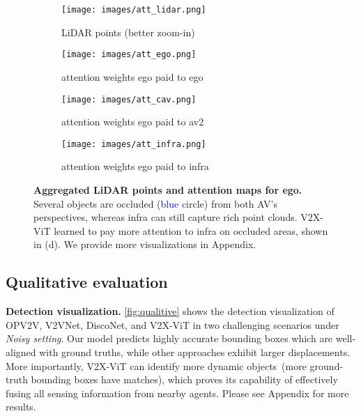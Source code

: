 \documentclass[runningheads]{llncs}
\begin{document}
\begin{figure}[!tb]
     \centering
     \begin{subfigure}[b]{0.24\textwidth}
         \centering
         \texttt{[image: images/att\_lidar.png]}
         \caption{LiDAR points (better zoom-in)}
         \label{fig:att_lidar}
     \end{subfigure}
     \begin{subfigure}[b]{0.24\textwidth}
         \centering
         \texttt{[image: images/att\_ego.png]}
         \caption{attention weights ego paid to ego}
         \label{fig:att_ego}
     \end{subfigure}
     \begin{subfigure}[b]{0.24\textwidth}
         \centering
         \texttt{[image: images/att\_cav.png]}
         \caption{attention weights ego paid to av2}
         \label{fig:att_cav}
     \end{subfigure}
     \begin{subfigure}[b]{0.24\textwidth}
         \centering
         \texttt{[image: images/att\_infra.png]}
         \caption{attention weights ego paid to infra}
         \label{fig:att_infra}
     \end{subfigure}
     
    \vspace{-2mm}
     \caption{\textbf{Aggregated LiDAR points and  attention maps for ego.} Several objects are occluded (\textcolor{blue}{blue} circle) from both AV's perspectives, whereas infra can still capture rich point clouds. V2X-ViT learned to pay more attention to infra on occluded areas, shown in (d). We provide more visualizations in Appendix.}
     \label{fig:infra}
     \vspace{-4mm}
\end{figure}
\subsection{Qualitative evaluation}
\noindent\textbf{Detection visualization.} \cref{fig:qualitive} shows the detection visualization of  OPV2V, V2VNet, DiscoNet, and V2X-ViT in two challenging scenarios under \textit{Noisy setting}. Our model predicts highly accurate bounding boxes which are well-aligned with ground truths, while other approaches exhibit larger displacements. More importantly, V2X-ViT can identify more dynamic objects~(more ground-truth bounding boxes have matches), which proves its capability of effectively fusing all sensing information from nearby agents. Please see Appendix for more results.
\end{document}
